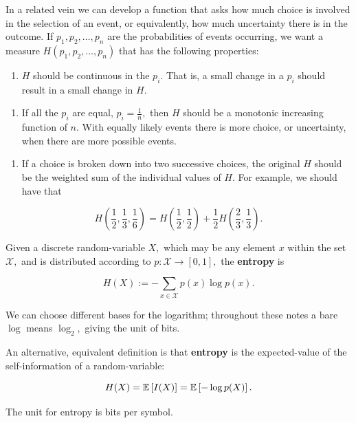 \documentclass{article}
\begin{document}
\begin{remark}
In a related vein we can develop a function that asks how much choice is involved in the selection of an event, or equivalently, how much uncertainty there is in the outcome. If $p_1, p_2, \dots, p_n$ are the probabilities of events occurring, we want a measure $H(p_1, p_2, \dots, p_n)$ that has the following properties:

\begin{enumerate}
\item $H$ should be \@{continuous} in the $p_i.$ That is, a small change in a $p_i$ should result in a small change in $H.$
\end{enumerate}

\begin{enumerate}
\item If all the $p_i$ are equal, $p_i = \frac{1}{n},$ then $H$ should be a \@{monotonic} \@{increasing} \@{function} of $n.$ With equally likely events there is more choice, or uncertainty, when there are more possible events.
\end{enumerate}

\begin{enumerate}
\item If a choice is broken down into two successive choices, the original $H$ should be the weighted sum of the individual values of $H.$ For example, we should have that
\end{enumerate}

\[ H(\frac{1}{2}, \frac{1}{3}, \frac{1}{6}) = H(\frac{1}{2}, \frac{1}{2}) + \frac{1}{2}H(\frac{2}{3}, \frac{1}{3}). \]
\end{remark}

\begin{definition}[Entropy]
Given a discrete \@{random-variable} $X,$ which may be any \@{element} $x$ within the set $\mathcal{X},$ and is distributed according to $p: \mathcal{X} \to [0,1],$ the \textbf{entropy} is

\[ H(X) := - \sum_{x \in \mathcal{X}} p(x) \log{p(x)}. \]

We can choose different bases for the logarithm; throughout these notes a bare $\log$ means $\log_2,$ giving the unit of \@{bits}.

An alternative, equivalent definition is that \textbf{entropy} is the \@{expected-value} of the \@{self-information} of a \@{random-variable}:

\[ H(X) = \mathbb{E}\left[I(X)\right] =  \mathbb{E} \left[-\log p(X)\right]. \]

The unit for entropy is bits per symbol.
\end{definition}
\end{document}
